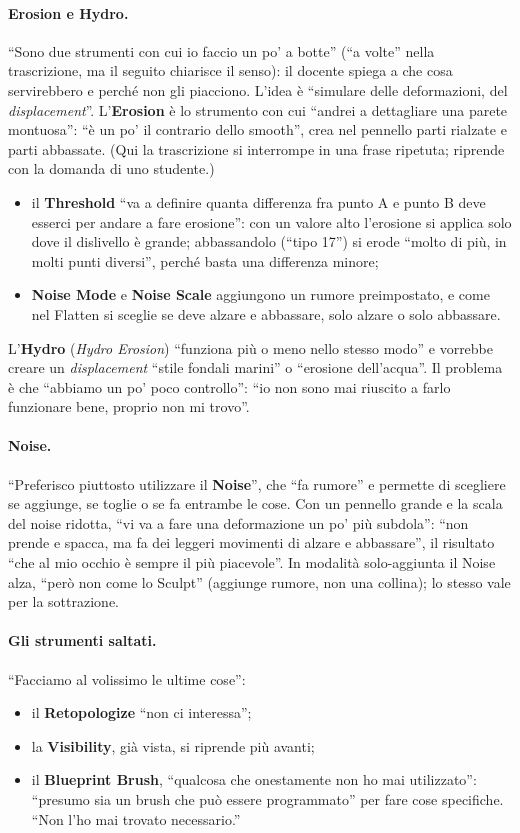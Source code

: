 \paragraph{Erosion e Hydro.} ``Sono due strumenti con cui io faccio un po' a botte'' (``a
volte'' nella trascrizione, ma il seguito chiarisce il senso): il
docente spiega a che cosa servirebbero e perché non gli piacciono. L'idea è ``simulare
delle deformazioni, del \emph{displacement}''. L'\textbf{Erosion} è lo strumento con cui
``andrei a dettagliare una parete montuosa'': ``è un po' il contrario dello smooth'', crea
nel pennello parti rialzate e parti abbassate. (Qui la trascrizione si interrompe in una
frase ripetuta; riprende con la domanda di uno studente.)
\begin{itemize}
  \item il \textbf{Threshold} ``va a definire quanta differenza fra punto A e punto B deve
        esserci per andare a fare erosione'': con un valore alto l'erosione si applica solo
        dove il dislivello è grande; abbassandolo (``tipo 17'') si erode ``molto di più, in
        molti punti diversi'', perché basta una differenza minore;
  \item \textbf{Noise Mode} e \textbf{Noise Scale} aggiungono un rumore preimpostato, e come
        nel Flatten si sceglie se deve alzare e abbassare, solo alzare o solo abbassare.
\end{itemize}
L'\textbf{Hydro} (\emph{Hydro Erosion}) ``funziona più o meno nello stesso modo'' e
vorrebbe creare un \emph{displacement} ``stile fondali marini'' o ``erosione dell'acqua''. Il
problema è che ``abbiamo un po' poco controllo'': ``io non sono mai riuscito a farlo
funzionare bene, proprio non mi trovo''.

\paragraph{Noise.} ``Preferisco piuttosto utilizzare il \textbf{Noise}'', che ``fa rumore'' e
permette di scegliere se aggiunge, se toglie o se fa entrambe le cose. Con un pennello
grande e la scala del noise ridotta, ``vi va a fare una deformazione un po' più subdola'':
``non prende e spacca, ma fa dei leggeri movimenti di alzare e abbassare'', il risultato
``che al mio occhio è sempre il più piacevole''. In modalità solo-aggiunta il Noise alza,
``però non come lo Sculpt'' (aggiunge rumore, non una collina); lo stesso vale per la
sottrazione.

\paragraph{Gli strumenti saltati.} ``Facciamo al volissimo le ultime cose'':
\begin{itemize}
  \item il \textbf{Retopologize} ``non ci interessa'';
  \item la \textbf{Visibility}, già vista, si riprende più avanti;
  \item il \textbf{Blueprint Brush}, ``qualcosa che onestamente non ho mai utilizzato'':
        ``presumo sia un brush che può essere programmato'' per fare cose specifiche. ``Non
        l'ho mai trovato necessario.''
\end{itemize}

